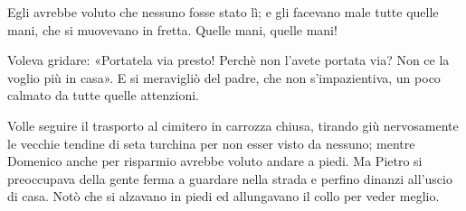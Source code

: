 Egli avrebbe voluto che nessuno fosse stato lì; e gli facevano male tutte quelle mani, che si muovevano in fretta. Quelle mani, quelle mani!

Voleva gridare: «Portatela via presto! Perchè non l'avete portata via? Non ce la voglio più in casa». E si meravigliò del padre, che non s'impazientiva, un poco calmato da tutte quelle attenzioni.

Volle seguire il trasporto al cimitero in carrozza chiusa, tirando giù nervosamente le vecchie tendine di seta turchina per non esser visto da nessuno; mentre Domenico anche per risparmio avrebbe voluto andare a piedi. Ma Pietro si preoccupava della gente ferma a guardare nella strada e perfino dinanzi all'uscio di casa. Notò che si alzavano in piedi ed allungavano il collo per veder meglio.
